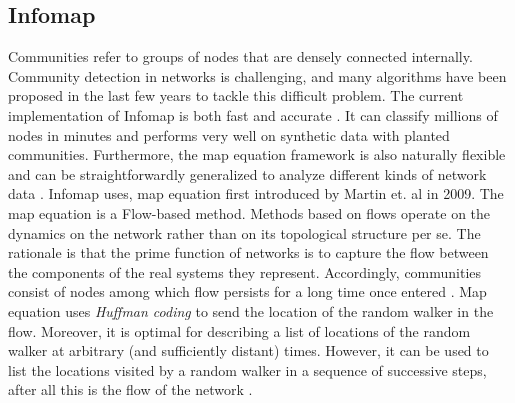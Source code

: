 \subsection{Infomap}\label{subsec:infomap}
Communities refer to groups of nodes that are densely connected internally. Community detection in networks is challenging, and many algorithms have been proposed in the last few years to tackle this difficult problem. The current implementation of Infomap is both fast and accurate \cite{ref-42}. It can classify millions of nodes in minutes and performs very well on synthetic data with planted communities. Furthermore, the map equation framework is also naturally flexible and can be straightforwardly generalized to analyze different kinds of network data \cite{ref-42}. Infomap uses, map equation \cite{ref-43} first introduced by Martin et. al in 2009. The map equation is a Flow-based method. Methods based on flows operate on the dynamics on the network rather than on its topological structure per se. The rationale is that the prime function of networks is to capture the flow between the components of the real systems they represent. Accordingly, communities consist of nodes among which flow persists for a long time once entered \cite{ref-42}. Map equation uses \textit{Huffman coding} \cite{ref-44} to send the location of the random walker \cite{ref-57} in the flow. Moreover, it is optimal for describing a list of locations of the random walker at arbitrary (and sufficiently distant) times. However, it can be used to list the locations visited by a random walker in a sequence of successive steps, after all this is the flow of the network \cite{ref-43}. 

